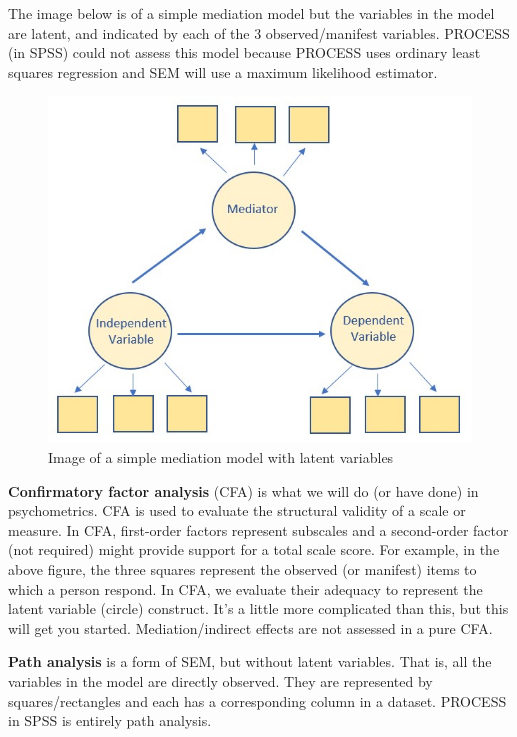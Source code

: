 \documentclass[
  11pt,
]{book}
\begin{document}
The image below is of a simple mediation model but the variables in the model are latent, and indicated by each of the 3 observed/manifest variables. PROCESS (in SPSS) could not assess this model because PROCESS uses ordinary least squares regression and SEM will use a maximum likelihood estimator.

\begin{figure}
\centering
\includegraphics{images/SimpleMod/SimpleMedLV.jpg}
\caption{Image of a simple mediation model with latent variables}
\end{figure}

\textbf{Confirmatory factor analysis} (CFA) is what we will do (or have done) in psychometrics. CFA is used to evaluate the structural validity of a scale or measure. In CFA, first-order factors represent subscales and a second-order factor (not required) might provide support for a total scale score. For example, in the above figure, the three squares represent the observed (or manifest) items to which a person respond. In CFA, we evaluate their adequacy to represent the latent variable (circle) construct. It's a little more complicated than this, but this will get you started. Mediation/indirect effects are not assessed in a pure CFA.

\textbf{Path analysis} is a form of SEM, but without latent variables. That is, all the variables in the model are directly observed. They are represented by squares/rectangles and each has a corresponding column in a dataset. PROCESS in SPSS is entirely path analysis.
\end{document}
